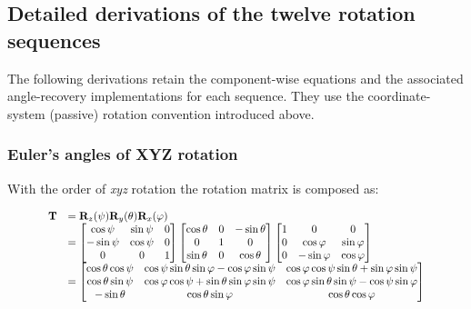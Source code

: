 \subsection{Detailed derivations of the twelve rotation sequences}
The following derivations retain the component-wise equations and the associated angle-recovery implementations for each sequence. They use the coordinate-system (passive) rotation convention introduced above.

\subsubsection{Euler's angles of \textbf{XYZ} rotation}

    With the order of \textit{xyz} rotation the rotation matrix is
    composed as:

    \begin{equation}
        \scalebox{0.85}{
            $ \begin{array}{ll}
                \mathbf{T}
                &= \mathbf{R}_{z}(\psi)\mathbf{R}_{y}(\theta)\mathbf{R}_{x}(\varphi) \\
                &=
                \begin{bmatrix}
                    \cos \psi & \sin \psi & 0 \\
                    -\sin \psi & \cos \psi & 0 \\
                    0 & 0 & 1
                \end{bmatrix}
                \begin{bmatrix}
                    \cos \theta & 0 & -\sin \theta \\
                    0 & 1 & 0 \\
                    \sin \theta & 0 & \cos \theta
                \end{bmatrix}
                \begin{bmatrix}
                    1 & 0 & 0 \\
                    0 & \cos \varphi & \sin \varphi \\
                    0 & -\sin \varphi & \cos \varphi
                \end{bmatrix} \\
                &=
                \begin{bmatrix}
                    \cos \theta \cos \psi
                    & \cos \psi \sin \theta \sin \varphi - \cos \varphi \sin \psi
                    & \cos \varphi \cos \psi \sin \theta + \sin \varphi \sin \psi \\
                    \cos \theta \sin \psi
                    & \cos \varphi \cos \psi + \sin \theta \sin \varphi \sin \psi
                    & \cos \varphi \sin \theta \sin \psi - \cos \psi \sin \varphi \\
                    -\sin \theta
                    & \cos \theta \sin \varphi
                    & \cos \theta \cos \varphi
                \end{bmatrix}
            \end{array} $
        }
    \end{equation}

